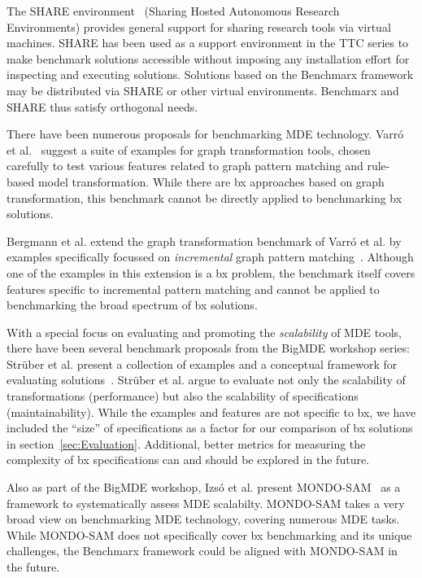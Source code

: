 The SHARE environment~\cite{DBLP:journals/procedia/GorpM11} (Sharing Hosted Autonomous Research Environments) provides general support for sharing research tools via virtual machines. SHARE has been used as a support environment in the TTC series to make benchmark solutions accessible without imposing any installation effort for inspecting and executing solutions.
Solutions based on the Benchmarx framework may be distributed via SHARE or other virtual environments.
Benchmarx and SHARE thus satisfy orthogonal needs.   

There have been numerous proposals for benchmarking MDE technology.
Varró et al.~\cite{DBLP:conf/vl/VarroSV05} suggest a suite of examples for graph transformation tools, chosen carefully to test various features related to graph pattern matching and rule-based model transformation.
While there are bx approaches based on graph transformation, this benchmark cannot be directly applied to benchmarking bx solutions.

Bergmann et al. extend the graph transformation benchmark of Varró et al. by examples specifically focussed on \emph{incremental} graph pattern matching~\cite{DBLP:conf/gg/BergmannHRV08}.
Although one of the examples in this extension is a bx problem, the benchmark itself covers features specific to incremental pattern matching and cannot be applied to benchmarking the broad spectrum of bx solutions.

With a special focus on evaluating and promoting the \emph{scalability} of MDE tools, there have been several benchmark proposals from the BigMDE workshop series: Strüber et al. present a collection of examples and a conceptual framework for evaluating solutions~\cite{DBLP:conf/staf/0001KAPR16}.
Strüber et al. argue to evaluate not only the scalability of transformations (performance) but also the scalability of specifications (maintainability).
While the examples and features are not specific to bx, we have included the ``size'' of specifications as a factor for our comparison of bx solutions in section~\ref{sec:Evaluation}.
Additional, better metrics for measuring the complexity of bx specifications can and should be explored in the future.

Also as part of the BigMDE workshop, Izsó et al. present MONDO-SAM~\cite{DBLP:conf/staf/IzsoSRV14} as a framework to systematically assess MDE scalabilty.
MONDO-SAM takes a very broad view on benchmarking MDE technology, covering numerous MDE tasks.
While MONDO-SAM does not specifically cover bx benchmarking and its unique challenges, the Benchmarx framework could be aligned with MONDO-SAM in the future.

